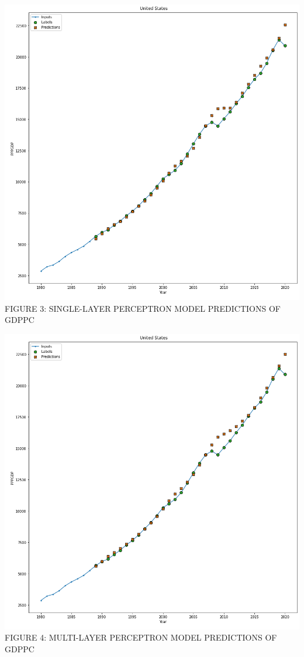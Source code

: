 \documentclass[final]{cvpr}
\begin{document}
\begin{center}
        \includegraphics[scale=0.27]{singleFiller.png}
        {\small
            FIGURE 3: SINGLE-LAYER PERCEPTRON MODEL PREDICTIONS OF GDPPC
        }

        \includegraphics[scale=0.27]{multiFiller.png}
        {\small
            FIGURE 4: MULTI-LAYER PERCEPTRON MODEL PREDICTIONS OF GDPPC
        }


\end{center}
\end{document}
